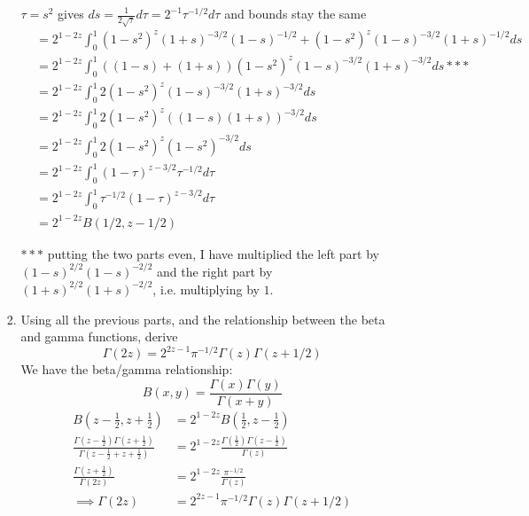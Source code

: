 \documentclass{X:/Documents/Coding/Latex/myassignment}
\begin{document}
\begin{enumerate}
\begin{enumerate}
\begin{enumerate}
	 	$\tau = s^2$ gives $ds = \frac1{2\sqrt{\tau}} d \tau = 2^{-1} \tau^{-1/2} d \tau$ and bounds stay the same 
	 	\begin{align*}
	 		&= 2^{1-2z}\int_0^1 (1-s^2)^z (1+s)^{-3/2} (1-s)^{-1/2} + (1-s^2)^z (1-s)^{-3/2} (1+s)^{-1/2} ds\\
	 		&= 2^{1-2z}\int_0^1\left((1-s) +(1+s)\right) (1-s^2)^z (1-s)^{-3/2} (1+s)^{-3/2} ds***\\
	 		&= 2^{1-2z}\int_0^1 2(1-s^2)^z (1-s)^{-3/2} (1+s)^{-3/2} ds\\
	 		&= 2^{1-2z}\int_0^1 2(1-s^2)^z ((1-s)(1+s))^{-3/2} ds\\
	 		&= 2^{1-2z}\int_0^1 2(1-s^2)^z (1 - s^2)^{-3/2} ds\\
	 		&= 2^{1-2z}\int_0^1 (1- \tau)^{z-3/2} \tau^{-1/2}d \tau\\
	 		&= 2^{1-2z}\int_0^1 \tau^{-1/2} (1- \tau)^{z-3/2} d \tau\\
	 		&= 2^{1-2z} B(1/2,z-1/2)
	 	\end{align*}

	 	$***$ putting the two parts even, I have multiplied the left part by $(1-s)^{2/2} (1-s)^{-2/2}$ and the right part by $(1+s)^{2/2} (1+s)^{-2/2}$, i.e. multiplying by $1$.
	 	
	 	\item Using all the previous parts, and the relationship between the beta and gamma functions, derive
	 	\[\Gamma(2z) = 2^{2z-1} \pi^{-1/2} \Gamma(z) \Gamma(z+1/2)\]
	 	We have the beta/gamma relationship:
	 	\[B(x,y) = \frac{\Gamma(x) \Gamma(y)}{\Gamma(x+y)}\]
	 	\begin{align*}
	 		 B(z-\frac12,z + \frac12) &= 2^{1-2z} B(\frac12,z-\frac12)\\
	 		 \frac{\Gamma(z-\frac12)\Gamma(z+\frac12)}{\Gamma(z-\frac12 + z + \frac12)} &=2^{1-2z} \frac{\Gamma(\frac12) \Gamma(z-\frac12)}{\Gamma(z)}\\
	 		 \frac{\Gamma(z+\frac12)}{\Gamma(2z)} &=2^{1-2z} \frac{\pi^{-1/2}}{\Gamma(z)}\\
	 		\implies \Gamma(2z) &= 2^{2z-1} \pi^{-1/2} \Gamma(z) \Gamma(z+1/2)
	 	\end{align*}
	 \end{enumerate}
	

\end{enumerate}
\end{enumerate}
\end{document}
